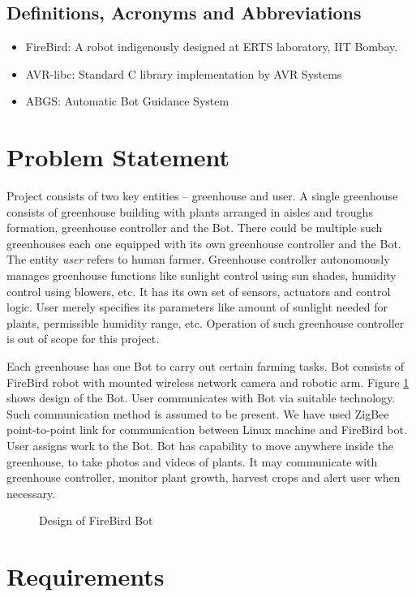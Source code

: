 \documentclass[a4paper, 12pt]{article}
\begin{document}
\subsection{Definitions, Acronyms and Abbreviations}
\begin{itemize}
 \item FireBird: A robot indigenously designed at ERTS laboratory, IIT Bombay. \cite{eyantra}
 \item AVR-libc: Standard C library implementation by AVR Systems
 \item ABGS: Automatic Bot Guidance System
\end{itemize}

\section{Problem Statement}
Project consists of two key entities -- greenhouse and user. A single greenhouse consists of greenhouse building with
plants arranged in aisles and troughs formation, greenhouse controller and the Bot. There could be multiple such 
greenhouses each one equipped with its own greenhouse controller and the Bot. The entity \emph{user} refers to human farmer.
Greenhouse controller autonomously manages greenhouse functions like sunlight control using sun shades, humidity control using
blowers, etc. It has its own set of sensors, actuators and control logic. User merely specifies its parameters 
like amount of sunlight needed for plants, permissible humidity range, etc. Operation of such greenhouse 
controller is out of scope for this project.

Each greenhouse has one Bot to carry out certain farming tasks. Bot consists of FireBird robot with mounted 
wireless network camera and robotic arm. Figure \ref{fig-bot} shows design of the Bot.
User communicates with Bot via suitable technology. Such communication method is assumed to be 
present. We have used ZigBee point-to-point link for communication between Linux machine and FireBird bot.
User assigns work to the Bot. Bot has capability to move anywhere inside the greenhouse, to take photos and 
videos of plants. It may communicate with greenhouse controller, monitor plant growth, harvest crops and 
alert user when necessary.

\begin{figure}

\caption{Design of FireBird Bot}
\label{fig-bot}
\end{figure}

\section{Requirements}
\end{document}

